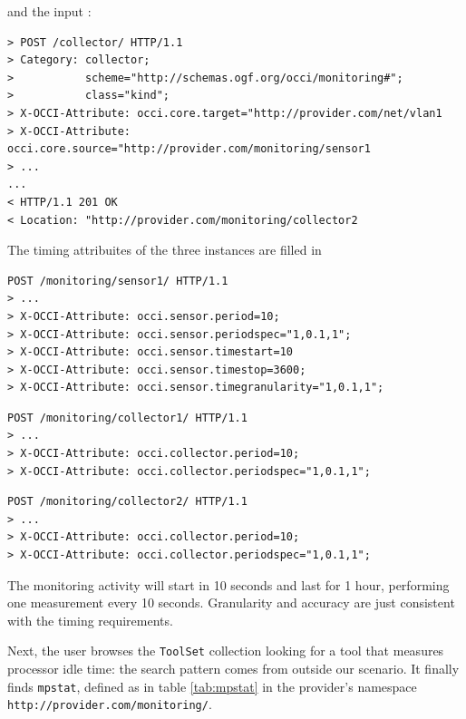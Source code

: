 \documentclass[12pt]{article}  %
\begin{document}
{and the input \coll:

\begin{verbatim}
> POST /collector/ HTTP/1.1
> Category: collector;
>           scheme="http://schemas.ogf.org/occi/monitoring#";
>           class="kind";
> X-OCCI-Attribute: occi.core.target="http://provider.com/net/vlan1
> X-OCCI-Attribute: occi.core.source="http://provider.com/monitoring/sensor1
> ...
...
< HTTP/1.1 201 OK
< Location: "http://provider.com/monitoring/collector2
\end{verbatim}
The timing attribuites of the three instances are filled in

\begin{verbatim}
POST /monitoring/sensor1/ HTTP/1.1
> ...
> X-OCCI-Attribute: occi.sensor.period=10;
> X-OCCI-Attribute: occi.sensor.periodspec="1,0.1,1";
> X-OCCI-Attribute: occi.sensor.timestart=10
> X-OCCI-Attribute: occi.sensor.timestop=3600;
> X-OCCI-Attribute: occi.sensor.timegranularity="1,0.1,1";
\end{verbatim}

\begin{verbatim}
POST /monitoring/collector1/ HTTP/1.1
> ...
> X-OCCI-Attribute: occi.collector.period=10;
> X-OCCI-Attribute: occi.collector.periodspec="1,0.1,1";
\end{verbatim}

\begin{verbatim}
POST /monitoring/collector2/ HTTP/1.1
> ...
> X-OCCI-Attribute: occi.collector.period=10;
> X-OCCI-Attribute: occi.collector.periodspec="1,0.1,1";
\end{verbatim}

The monitoring activity will start in 10 seconds and last for 1 hour, performing one measurement every 10 seconds. Granularity and accuracy are just consistent with the timing requirements.

Next, the user browses the {\tt ToolSet} collection looking for a tool that measures processor idle time: the search pattern comes from outside our scenario. It finally finds {\tt mpstat}, defined as in table \ref{tab:mpstat} in the provider's namespace {\tt http://provider.com/monitoring/}.

\begin{table}
\scriptsize
{}

\caption{Attributes defined for the {\tt mpstat} mixin \label{tab:mpstat}}
\end {table}

}
\end{document}
